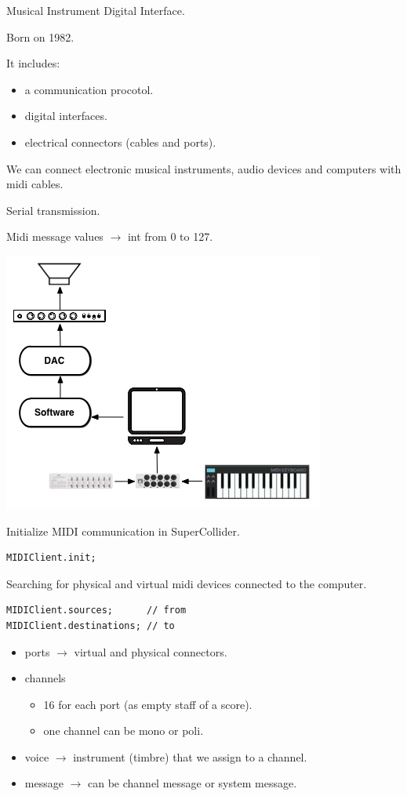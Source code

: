 Musical Instrument Digital Interface.

Born on 1982.

It includes:

\begin{itemize}
\tightlist
\item a communication procotol.
\item digital interfaces.
\item electrical connectors (cables and ports).
\end{itemize}

We can connect electronic musical instruments, audio devices and computers with midi cables.

Serial transmission.

Midi message values \(\rightarrow\) int from 0 to 127.

\begin{center}
\includegraphics[scale=0.7]{../img/MIDI_1.png}
\end{center}

Initialize MIDI communication in SuperCollider.

\begin{lstlisting}[frame=single] 
MIDIClient.init;	
\end{lstlisting} 

Searching for physical and virtual midi devices connected to the computer. 

\begin{lstlisting}[frame=single] 
MIDIClient.sources;      // from
MIDIClient.destinations; // to
\end{lstlisting} 

\begin{itemize}
\tightlist
\item ports \(\rightarrow\) virtual and physical connectors.
\item channels
      \begin{itemize}
      \tightlist
      \item 16 for each port (as empty staff of a score).
      \item one channel can be mono or poli.
      \end{itemize}
\item voice \(\rightarrow\) instrument (timbre) that we assign to a channel.
\item message \(\rightarrow\) can be channel message or system message.
\end{itemize}

